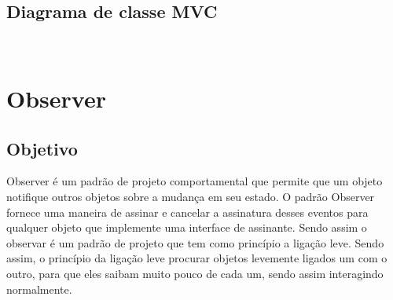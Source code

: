 \documentclass[a4paper]{article}
\begin{document}
  \subsection{Diagrama de classe MVC}
  \\[0.5cm]

    \section{Observer}

    \subsection{Objetivo}

    Observer é um padrão de projeto comportamental que permite que um objeto notifique outros objetos sobre a mudança em seu estado. O padrão Observer fornece uma maneira de assinar e cancelar a assinatura desses eventos para qualquer objeto que implemente uma interface de assinante. Sendo assim o observar é um padrão de projeto que tem como princípio a ligação leve.
	Sendo assim, o princípio da ligação leve procurar objetos levemente ligados um com o outro, para que eles saibam muito pouco de cada um, sendo assim interagindo normalmente.
\end{document}
